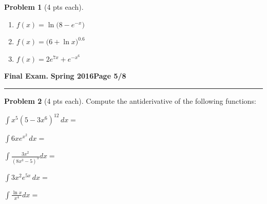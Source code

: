 \documentclass[12pt]{article}
\theoremstyle{definition}
\newtheorem{problem}{Problem}
\begin{document}
\begin{problem}[4 pts each]
\begin{enumerate}
\item $f(x) = \ln \big(8 - e^{-x}\big)$
\begin{flushright}
\end{flushright}
\item $f(x) = \big( 6 + \ln x \big)^{0.6}$
\begin{flushright}
\end{flushright}
\item $f(x) = 2e^{7x} + e^{-x^6}$
\begin{flushright}
\end{flushright}
\end{enumerate}
\end{problem}

\newpage

\hfill{\large\bf Final Exam.}\hfill{\large\bf
  Spring 2016}\hfill{\large\bf Page 5/8}\hrule

\bigskip 

\begin{problem}[4 pts each]
Compute the antiderivative of the following functions:
\item $\displaystyle{\int x^5 (5 - 3x^6)^{12}\, dx =}$
\vspace{2cm}
\item $\displaystyle{\int  6xe^{x^2} \, dx =}$
\vspace{2cm}
\item $\displaystyle{\int \frac{3x^2}{(8x^3-5)^3} dx =}$
\vspace{4cm}
\item $\displaystyle{\int 3x^2 e^{5x}\, dx =}$
\vspace{4cm}
\item $\displaystyle{\int \frac{\ln x}{x^4} dx =}$
\vspace{4cm}
\end{problem}
\end{document}
